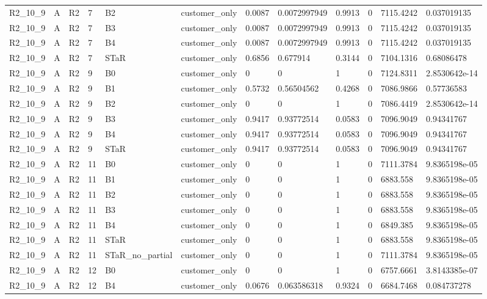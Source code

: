 \begin{longtable}{llllllllllll}
R2\_10\_9 & A & R2 & 7 & B2 & customer\_only & 0.0087 & 0.0072997949 & 0.9913 & 0 & 7115.4242 & 0.037019135 \\
R2\_10\_9 & A & R2 & 7 & B3 & customer\_only & 0.0087 & 0.0072997949 & 0.9913 & 0 & 7115.4242 & 0.037019135 \\
R2\_10\_9 & A & R2 & 7 & B4 & customer\_only & 0.0087 & 0.0072997949 & 0.9913 & 0 & 7115.4242 & 0.037019135 \\
R2\_10\_9 & A & R2 & 7 & STaR & customer\_only & 0.6856 & 0.677914 & 0.3144 & 0 & 7104.1316 & 0.68086478 \\
R2\_10\_9 & A & R2 & 9 & B0 & customer\_only & 0 & 0 & 1 & 0 & 7124.8311 & 2.8530642e-14 \\
R2\_10\_9 & A & R2 & 9 & B1 & customer\_only & 0.5732 & 0.56504562 & 0.4268 & 0 & 7086.9866 & 0.57736583 \\
R2\_10\_9 & A & R2 & 9 & B2 & customer\_only & 0 & 0 & 1 & 0 & 7086.4419 & 2.8530642e-14 \\
R2\_10\_9 & A & R2 & 9 & B3 & customer\_only & 0.9417 & 0.93772514 & 0.0583 & 0 & 7096.9049 & 0.94341767 \\
R2\_10\_9 & A & R2 & 9 & B4 & customer\_only & 0.9417 & 0.93772514 & 0.0583 & 0 & 7096.9049 & 0.94341767 \\
R2\_10\_9 & A & R2 & 9 & STaR & customer\_only & 0.9417 & 0.93772514 & 0.0583 & 0 & 7096.9049 & 0.94341767 \\
R2\_10\_9 & A & R2 & 11 & B0 & customer\_only & 0 & 0 & 1 & 0 & 7111.3784 & 9.8365198e-05 \\
R2\_10\_9 & A & R2 & 11 & B1 & customer\_only & 0 & 0 & 1 & 0 & 6883.558 & 9.8365198e-05 \\
R2\_10\_9 & A & R2 & 11 & B2 & customer\_only & 0 & 0 & 1 & 0 & 6883.558 & 9.8365198e-05 \\
R2\_10\_9 & A & R2 & 11 & B3 & customer\_only & 0 & 0 & 1 & 0 & 6883.558 & 9.8365198e-05 \\
R2\_10\_9 & A & R2 & 11 & B4 & customer\_only & 0 & 0 & 1 & 0 & 6849.385 & 9.8365198e-05 \\
R2\_10\_9 & A & R2 & 11 & STaR & customer\_only & 0 & 0 & 1 & 0 & 6883.558 & 9.8365198e-05 \\
R2\_10\_9 & A & R2 & 11 & STaR\_no\_partial & customer\_only & 0 & 0 & 1 & 0 & 7111.3784 & 9.8365198e-05 \\
R2\_10\_9 & A & R2 & 12 & B0 & customer\_only & 0 & 0 & 1 & 0 & 6757.6661 & 3.8143385e-07 \\
R2\_10\_9 & A & R2 & 12 & B4 & customer\_only & 0.0676 & 0.063586318 & 0.9324 & 0 & 6684.7468 & 0.084737278 \\

\end{longtable}
